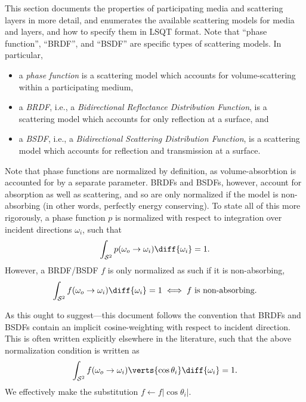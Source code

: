 \documentclass[
    twoside,
    twocolumn,
    letterpaper,
    10pt]{article}
\begin{document}
This section documents the properties of participating media and 
scattering layers in more detail, and enumerates the available 
scattering models for media and layers, and how to specify them in 
LSQT format. Note that ``phase function'', ``BRDF'', and ``BSDF'' are
specific types of scattering models. In particular,
\begin{itemize}
    \item a \emph{phase function} is a scattering model which accounts
        for volume-scattering within a participating medium,
    \item a \emph{BRDF}, i.e., a \emph{Bidirectional Reflectance Distribution 
        Function}, is a scattering model which accounts for only reflection at 
        a surface, and
    \item a \emph{BSDF}, i.e., a \emph{Bidirectional Scattering Distribution 
        Function}, is a scattering model which accounts for reflection and 
        transmission at a surface.
\end{itemize}

Note that phase functions are normalized by 
definition, as volume-absorbtion is accounted for by a separate parameter. 
BRDFs and BSDFs, however, account for absorption as well as scattering, 
and so are only normalized if the model is non-absorbing (in other words,
perfectly energy conserving). To state all of this more rigorously, a
phase function $p$ is normalized with respect to integration over 
incident directions $\omega_i$, such that
\begin{equation*}
    \int_{\mathcal{S}^2} p(\omega_o\to\omega_i) \diff{\omega_i} = 1.
\end{equation*}
However, a BRDF/BSDF $f$ is only normalized as such if it is 
non-absorbing,
\begin{equation*}
    \int_{\mathcal{S}^2} f(\omega_o\to\omega_i) \diff{\omega_i} = 1
    \iff \text{$f$ is non-absorbing.}
\end{equation*}

As this ought to suggest---this document follows the convention that BRDFs 
and BSDFs contain an implicit cosine-weighting with respect to incident
direction. This is often written explicitly elsewhere in the literature,
such that the above normalization condition is written as
\begin{equation*}
    \int_{\mathcal{S}^2} f(\omega_o\to\omega_i) \verts{\cos{\theta_i}}
    \diff{\omega_i} = 1.
\end{equation*}
We effectively make the substitution $f\gets f|{\cos{\theta_i}}|$.
\end{document}
